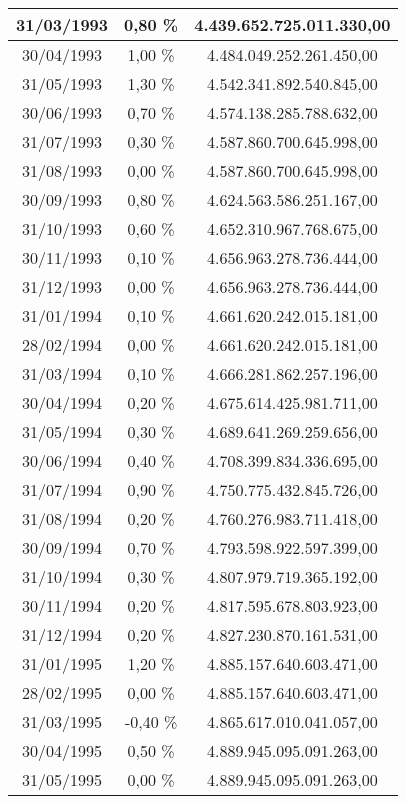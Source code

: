 \begin{center}
\begin{longtable}{|c|c|c|}
31/03/1993 & 0,80 \% & 4.439.652.725.011.330,00  \\ \hline
30/04/1993 & 1,00 \% & 4.484.049.252.261.450,00  \\ \hline
31/05/1993 & 1,30 \% & 4.542.341.892.540.845,00  \\ \hline
30/06/1993 & 0,70 \% & 4.574.138.285.788.632,00  \\ \hline
31/07/1993 & 0,30 \% & 4.587.860.700.645.998,00  \\ \hline
31/08/1993 & 0,00 \% & 4.587.860.700.645.998,00  \\ \hline
30/09/1993 & 0,80 \% & 4.624.563.586.251.167,00  \\ \hline
31/10/1993 & 0,60 \% & 4.652.310.967.768.675,00  \\ \hline
30/11/1993 & 0,10 \% & 4.656.963.278.736.444,00  \\ \hline
31/12/1993 & 0,00 \% & 4.656.963.278.736.444,00  \\ \hline
31/01/1994 & 0,10 \% & 4.661.620.242.015.181,00  \\ \hline
28/02/1994 & 0,00 \% & 4.661.620.242.015.181,00  \\ \hline
31/03/1994 & 0,10 \% & 4.666.281.862.257.196,00  \\ \hline
30/04/1994 & 0,20 \% & 4.675.614.425.981.711,00  \\ \hline
31/05/1994 & 0,30 \% & 4.689.641.269.259.656,00  \\ \hline
30/06/1994 & 0,40 \% & 4.708.399.834.336.695,00  \\ \hline
31/07/1994 & 0,90 \% & 4.750.775.432.845.726,00  \\ \hline
31/08/1994 & 0,20 \% & 4.760.276.983.711.418,00  \\ \hline
30/09/1994 & 0,70 \% & 4.793.598.922.597.399,00  \\ \hline
31/10/1994 & 0,30 \% & 4.807.979.719.365.192,00  \\ \hline
30/11/1994 & 0,20 \% & 4.817.595.678.803.923,00  \\ \hline
31/12/1994 & 0,20 \% & 4.827.230.870.161.531,00  \\ \hline
31/01/1995 & 1,20 \% & 4.885.157.640.603.471,00  \\ \hline
28/02/1995 & 0,00 \% & 4.885.157.640.603.471,00  \\ \hline
31/03/1995 & -0,40 \% & 4.865.617.010.041.057,00  \\ \hline
30/04/1995 & 0,50 \% & 4.889.945.095.091.263,00  \\ \hline
31/05/1995 & 0,00 \% & 4.889.945.095.091.263,00  \\ \hline

\end{longtable}
\end{center}
